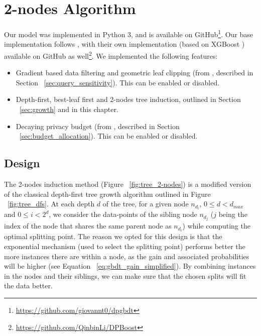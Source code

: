 \chapter{2-nodes Algorithm}\label{chap:2-nodes}

Our model was implemented in Python 3, and is available on GitHub\footnote{\href{https://github.com/giovannt0/dpgbdt}{https://github.com/giovannt0/dpgbdt}}. Our base implementation follows \cite{dpgbdt}, with their own implementation (based on XGBoost \cite{xgboost}) available on GitHub as well\footnote{\href{https://github.com/QinbinLi/DPBoost}{https://github.com/QinbinLi/DPBoost}}. We implemented the following features:

\begin{itemize}
	\item Gradient based data filtering and geometric leaf clipping (from \cite{dpgbdt}, described in Section ~\ref{sec:query_sensitivity}). This can be enabled or disabled.
	\item Depth-first, best-leaf first and 2-nodes tree induction, outlined in Section ~\ref{sec:growth} and in this chapter.
	\item Decaying privacy budget (from \cite{wen_wang}, described in Section ~\ref{sec:budget_allocation}). This can be enabled or disabled.
\end{itemize}

\section{Design}

The 2-nodes induction method (Figure ~\ref{fig:tree_2-nodes}) is a modified version of the classical depth-first tree growth algorithm outlined in Figure ~\ref{fig:tree_dfs}. At each depth $d$ of the tree, for a given node $n_{d_i}$, $0 \leq d < d_{max}$ and $0 \leq i < 2^d$, we consider the data-points of the sibling node $n_{d_j}$ ($j$ being the index of the node that shares the same parent node as $n_{d_i}$) while computing the optimal splitting point.
The reason we opted for this design is that the exponential mechanism (used to select the splitting point) performs better the more instances there are within a node, as the gain and associated probabilities will be higher (see Equation ~\ref{eq:gbdt_gain_simplified}). By combining instances in the nodes and their siblings, we can make sure that the chosen splits will fit the data better.


